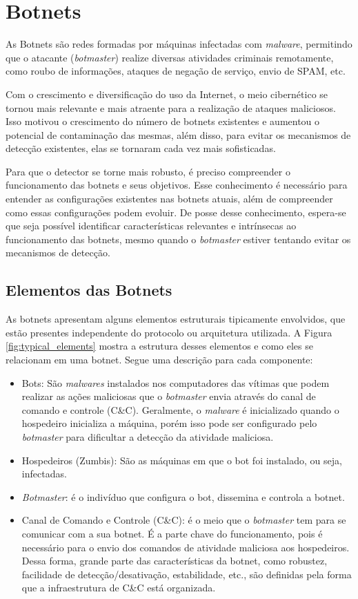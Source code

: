 \chapter{Botnets}
As Botnets são redes formadas por máquinas infectadas com \textit{malware}, permitindo que o atacante (\textit{botmaster}) realize diversas atividades criminais remotamente, como roubo de informações, ataques de negação de serviço, envio de SPAM, etc.\cite{silva2013botnets}

Com o crescimento e diversificação do uso da Internet, o meio cibernético se tornou mais relevante e mais atraente para a realização de ataques maliciosos. Isso motivou o crescimento do número de botnets existentes e aumentou o potencial de contaminação das mesmas, além disso, para evitar os mecanismos de detecção existentes, elas se tornaram cada vez mais sofisticadas.

Para que o detector se torne mais robusto, é preciso compreender o funcionamento das botnets e seus objetivos. Esse conhecimento é necessário para entender as configurações existentes nas botnets atuais, além de compreender como essas configurações podem evoluir. De posse desse conhecimento, espera-se que seja possível identificar características relevantes e intrínsecas ao funcionamento das botnets, mesmo quando o \textit{botmaster} estiver tentando evitar os mecanismos de detecção.

\section{Elementos das Botnets}
As botnets apresentam alguns elementos estruturais tipicamente envolvidos, que estão presentes independente do protocolo ou arquitetura utilizada. A Figura \ref{fig:typical_elements} mostra a estrutura desses elementos e como eles se relacionam em uma botnet. Segue uma descrição para cada componente:
\begin{itemize}  
\item Bots: São \textit{malwares} instalados nos computadores das vítimas que podem realizar as ações maliciosas que o \textit{botmaster} envia através do canal de comando e controle (C\&C). Geralmente, o \textit{malware} é inicializado quando o hospedeiro inicializa a máquina, porém isso pode ser configurado pelo \textit{botmaster} para dificultar a detecção da atividade maliciosa.
\item Hospedeiros (Zumbis): São as máquinas em que o bot foi instalado, ou seja, infectadas.\cite{puri2003bots}
\item \textit{Botmaster}: é o indivíduo que configura o bot, dissemina e controla a botnet.
\item Canal de Comando e Controle (C\&C): é o meio que o \textit{botmaster} tem para se comunicar com a sua botnet. É a parte chave do funcionamento, pois é necessário para o envio dos comandos de atividade maliciosa aos hospedeiros. Dessa forma, grande parte das características da botnet, como robustez, facilidade de detecção/desativação, estabilidade, etc., são definidas pela forma que a infraestrutura de C\&C está organizada.
\end{itemize}

